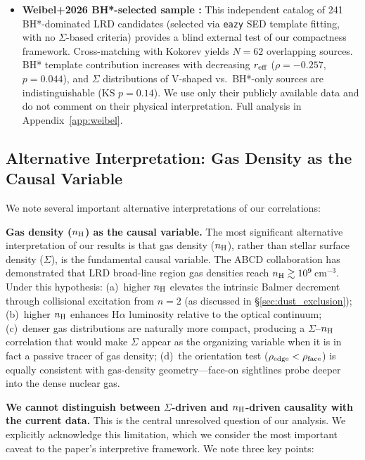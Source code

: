\documentclass[twocolumn,linenumbers]{aastex631}
\begin{document}
\begin{itemize}
\item \textbf{Weibel+2026 BH*-selected sample \citep{Weibel2026}:} This independent catalog of 241 BH*-dominated LRD candidates (selected via \texttt{eazy} SED template fitting, with no $\Sigma$-based criteria) provides a blind external test of our compactness framework. Cross-matching with Kokorev yields $N=62$ overlapping sources. BH* template contribution increases with decreasing $r_{\rm eff}$ ($\rho = -0.257$, $p = 0.044$), and $\Sigma$ distributions of V-shaped vs.\ BH*-only sources are indistinguishable (KS $p = 0.14$). We use only their publicly available data and do not comment on their physical interpretation. Full analysis in Appendix~\ref{app:weibel}.
\end{itemize}

\subsection{Alternative Interpretation: Gas Density as the Causal Variable}

We note several important alternative interpretations of our correlations:

\textbf{Gas density ($n_{\rm H}$) as the causal variable.} The most significant alternative interpretation of our results is that gas density ($n_{\rm H}$), rather than stellar surface density ($\Sigma$), is the fundamental causal variable. The ABCD collaboration \citep{Chen2026ABCD} has demonstrated that LRD broad-line region gas densities reach $n_{\rm H} \gtrsim 10^9$\,cm$^{-3}$. Under this hypothesis: (a)~higher $n_{\rm H}$ elevates the intrinsic Balmer decrement through collisional excitation from $n=2$ (as discussed in \S\ref{sec:dust_exclusion}); (b)~higher $n_{\rm H}$ enhances H$\alpha$ luminosity relative to the optical continuum; (c)~denser gas distributions are naturally more compact, producing a $\Sigma$--$n_{\rm H}$ correlation that would make $\Sigma$ appear as the organizing variable when it is in fact a passive tracer of gas density; (d)~the orientation test ($\rho_{\rm edge} < \rho_{\rm face}$) is equally consistent with gas-density geometry---face-on sightlines probe deeper into the dense nuclear gas.

\textbf{We cannot distinguish between $\Sigma$-driven and $n_{\rm H}$-driven causality with the current data.} This is the central unresolved question of our analysis. We explicitly acknowledge this limitation, which we consider the most important caveat to the paper's interpretive framework. We note three key points:
\end{document}
